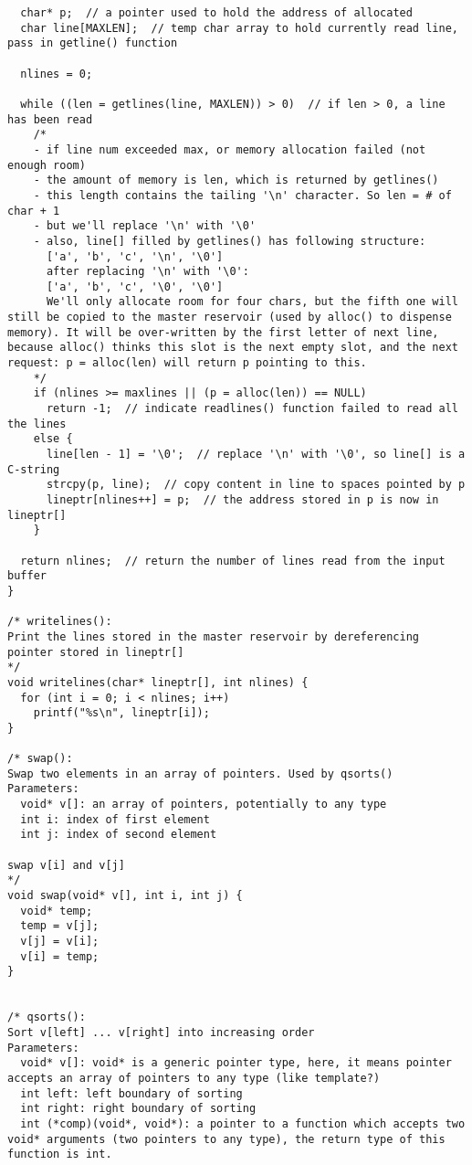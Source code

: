 \documentclass[12pt]{article}
\begin{document}
\begin{verbatim}
  char* p;  // a pointer used to hold the address of allocated 
  char line[MAXLEN];  // temp char array to hold currently read line, pass in getline() function

  nlines = 0;

  while ((len = getlines(line, MAXLEN)) > 0)  // if len > 0, a line has been read
    /* 
    - if line num exceeded max, or memory allocation failed (not enough room)
    - the amount of memory is len, which is returned by getlines()
    - this length contains the tailing '\n' character. So len = # of char + 1
    - but we'll replace '\n' with '\0'
    - also, line[] filled by getlines() has following structure:
      ['a', 'b', 'c', '\n', '\0']
      after replacing '\n' with '\0':
      ['a', 'b', 'c', '\0', '\0']
      We'll only allocate room for four chars, but the fifth one will still be copied to the master reservoir (used by alloc() to dispense memory). It will be over-written by the first letter of next line, because alloc() thinks this slot is the next empty slot, and the next request: p = alloc(len) will return p pointing to this.
    */
    if (nlines >= maxlines || (p = alloc(len)) == NULL)
      return -1;  // indicate readlines() function failed to read all the lines
    else {
      line[len - 1] = '\0';  // replace '\n' with '\0', so line[] is a C-string
      strcpy(p, line);  // copy content in line to spaces pointed by p
      lineptr[nlines++] = p;  // the address stored in p is now in lineptr[] 
    }

  return nlines;  // return the number of lines read from the input buffer
}

/* writelines(): 
Print the lines stored in the master reservoir by dereferencing pointer stored in lineptr[] 
*/
void writelines(char* lineptr[], int nlines) {
  for (int i = 0; i < nlines; i++)
    printf("%s\n", lineptr[i]);
}

/* swap(): 
Swap two elements in an array of pointers. Used by qsorts()
Parameters:
  void* v[]: an array of pointers, potentially to any type 
  int i: index of first element 
  int j: index of second element

swap v[i] and v[j]
*/
void swap(void* v[], int i, int j) {
  void* temp;
  temp = v[j];
  v[j] = v[i];
  v[i] = temp;
}


/* qsorts(): 
Sort v[left] ... v[right] into increasing order
Parameters:
  void* v[]: void* is a generic pointer type, here, it means pointer accepts an array of pointers to any type (like template?)
  int left: left boundary of sorting 
  int right: right boundary of sorting
  int (*comp)(void*, void*): a pointer to a function which accepts two void* arguments (two pointers to any type), the return type of this function is int.


\end{verbatim}
\end{document}
